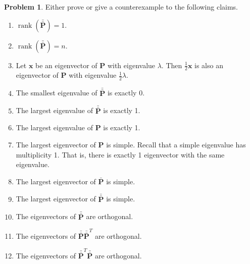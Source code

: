 \documentclass[10pt]{article}
\theoremstyle{definition}
\newtheorem{problem}{Problem}
\DeclareMathOperator{\rank}{rank}
\newcommand{\p}{\mathbf P}
\newcommand{\pb}{\bar {\p}}
\newcommand{\pbb}{\bar {\pb}}
\newcommand{\trans}[1]{{#1}^{T}}
\newcommand{\x}{\mathbf x}
\begin{document}
\newpage
\begin{problem}
    Either prove or give a counterexample to the following claims.
    \begin{enumerate}
        \item
            $\rank(\pbb) = 1$.
            \vspace{3in}
        \item
            $\rank(\pbb) = n$.
            \vspace{3in}

        \item
            Let $\x$ be an eigenvector of $\p$ with eigenvalue $\lambda$.
            Then $\frac 1 2 \x$ is also an eigenvector of $\p$ with eigenvalue $\frac 1 2 \lambda$.
            \vspace{3in}

        \item
            The smallest eigenvalue of $\pbb$ is exactly 0.
            \vspace{3in}
        \item
            The largest eigenvalue of $\pbb$ is exactly 1.
            \vspace{3in}
        \item
            The largest eigenvalue of $\p$ is exactly 1.
            \vspace{3in}

        \item
            The largest eigenvector of $\p$ is simple.
            Recall that a simple eigenvalue has multiplicity 1.
            That is, there is exactly 1 eigenvector with the same eigenvalue.
            \vspace{3in}

        \item
            The largest eigenvector of $\pb$ is simple.
            \vspace{3in}

        \item
            The largest eigenvector of $\pbb$ is simple.
            \vspace{3in}

        \item
            The eigenvectors of $\pbb$ are orthogonal.
            \vspace{3in}

        \item
            The eigenvectors of $\pbb\trans\pbb$ are orthogonal.
            \vspace{3in}

        \item
            The eigenvectors of $\trans\pbb\pbb$ are orthogonal.
            \vspace{3in}
    \end{enumerate}
\end{problem}
\end{document}
